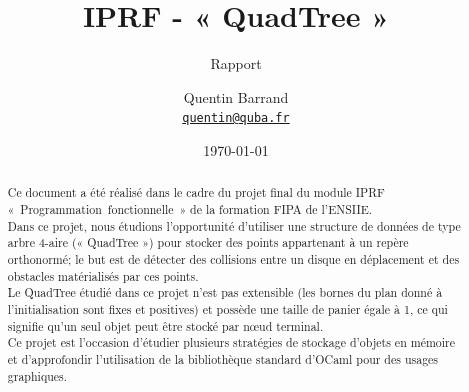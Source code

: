 \documentclass[11pt]{scrartcl}
\begin{document}
\title{\textbf{IPRF - « QuadTree »}}
\subtitle{Rapport}

\author{Quentin Barrand\\
		\href{mailto:quentin@quba.fr}{\texttt{quentin@quba.fr}}}
		
\date{\today}

\maketitle

\begin{abstract}
Ce document a été réalisé dans le cadre du projet final du module IPRF \mbox{« Programmation fonctionnelle »} de la formation FIPA de l'ENSIIE.\\
Dans ce projet, nous étudions l'opportunité d'utiliser une structure de données de type arbre 4-aire (« QuadTree ») pour stocker des points appartenant à un repère orthonormé; le but est de détecter des collisions entre un disque en déplacement et des obstacles matérialisés par ces points.\\
Le QuadTree étudié dans ce projet n'est pas extensible (les bornes du plan donné à l'initialisation sont fixes et positives) et possède une taille de panier égale à 1, ce qui signifie qu'un seul objet peut être stocké par nœud terminal.\\
Ce projet est l'occasion d'étudier plusieurs stratégies de stockage d'objets en mémoire et d'approfondir l'utilisation de la bibliothèque standard d'OCaml pour des usages graphiques.
\end{abstract}

\vspace{11mm}

\begin{figure}[h]
	\centering
\end{figure}
\end{document}

